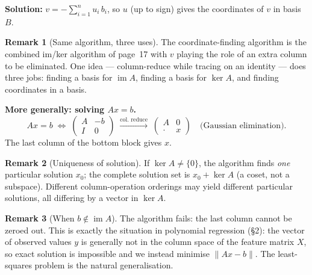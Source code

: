 \documentclass[11pt]{article}
\theoremstyle{definition}
\newtheorem{remark}{Remark}[section]
\theoremstyle{plain}
\begin{document}
\textbf{Solution:} $\displaystyle v = -\sum_{i=1}^n u_i\,b_i$, so $u$
(up to sign) gives the coordinates of $v$ in basis $B$.

\begin{remark}[Same algorithm, three uses]
  The coordinate-finding algorithm is the combined im/ker algorithm of
  page~17 with $v$ playing the role of an extra column to be eliminated.
  One idea — column-reduce while tracing on an identity — does three jobs:
  finding a basis for $\operatorname{im}A$, finding a basis for $\ker A$,
  and finding coordinates in a basis.
\end{remark}

\medskip\noindent
\textbf{More generally: solving $Ax = b$.}
\[
  Ax = b
  \;\Longleftrightarrow\;
  \left(\begin{array}{c|c} A & -b \\ \hline I & 0 \end{array}\right)
  \;\xrightarrow{\text{col.\ reduce}}\;
  \left(\begin{array}{c|c} A & 0 \\ \hline \cdot & x \end{array}\right)
  \quad\text{(Gaussian elimination).}
\]
The last column of the bottom block gives $x$.

\begin{remark}[Uniqueness of solution]
  If $\ker A \neq \{0\}$, the algorithm finds \emph{one} particular solution
  $x_0$; the complete solution set is $x_0 + \ker A$ (a coset, not a
  subspace).  Different column-operation orderings may yield different
  particular solutions, all differing by a vector in $\ker A$.
\end{remark}

\begin{remark}[When $b \notin \operatorname{im}A$]
  The algorithm fails: the last column cannot be zeroed out.  This is exactly
  the situation in polynomial regression (\S2): the vector of observed values
  $y$ is generally not in the column space of the feature matrix $X$, so
  exact solution is impossible and we instead minimise $\|Ax - b\|$.
  The least-squares problem is the natural generalisation.
\end{remark}
\end{document}
